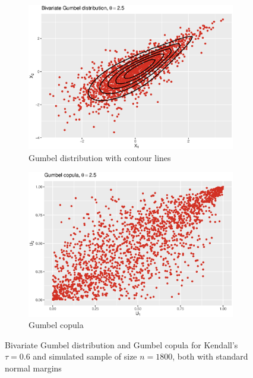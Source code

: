  \begin{figure}[H]
\centering
\begin{subfigure}{.45\textwidth}
  \centering
  \includegraphics[width=\linewidth]{figures/bivariate_gumbel.eps}
  \caption{Gumbel distribution with contour lines}
  \label{fig:bivariate_gumbel}
\end{subfigure}
\begin{subfigure}{.45\textwidth}
  \centering
  \includegraphics[width=\linewidth]{figures/gumbel_copula.eps}
  \caption{Gumbel copula}
  \label{fig:gumbel_copula}
\end{subfigure}
\caption{Bivariate Gumbel distribution and Gumbel copula for Kendall's $\tau = 0.6$ and simulated sample of size $n = 1800$, both with standard normal margins}
\label{fig:gumbel_plots}
\end{figure}



